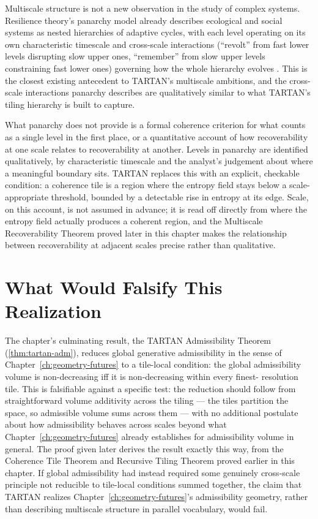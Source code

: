 \documentclass[12pt,twoside,openright]{book}
\begin{document}
Multiscale structure is not a new observation in the study of
complex systems. Resilience theory's panarchy model already
describes ecological and social systems as nested hierarchies
of adaptive cycles, with each level operating on its own
characteristic timescale and cross-scale interactions
(``revolt'' from fast lower levels disrupting slow upper ones,
``remember'' from slow upper levels constraining fast lower
ones) governing how the whole hierarchy evolves
\parencite{holling1973,gunderson2002,walker2004}. This is the
closest existing antecedent to TARTAN's multiscale ambitions,
and the cross-scale interactions panarchy describes are
qualitatively similar to what TARTAN's tiling hierarchy is
built to capture.

What panarchy does not provide is a formal coherence criterion
for what counts as a single level in the first place, or a
quantitative account of how recoverability at one scale
relates to recoverability at another. Levels in panarchy are
identified qualitatively, by characteristic timescale and
the analyst's judgement about where a meaningful boundary
sits. TARTAN replaces this with an explicit, checkable
condition: a coherence tile is a region where the entropy
field stays below a scale-appropriate threshold, bounded by a
detectable rise in entropy at its edge. Scale, on this
account, is not assumed in advance; it is read off directly
from where the entropy field actually produces a coherent
region, and the Multiscale Recoverability Theorem proved later
in this chapter makes the relationship between recoverability
at adjacent scales precise rather than qualitative.

\section{What Would Falsify This Realization}
\label{sec:ch26-falsifiability}

The chapter's culminating result, the TARTAN Admissibility
Theorem (\cref{thm:tartan-adm}), reduces global generative
admissibility in the sense of Chapter~\ref{ch:geometry-futures}
to a tile-local condition: the global admissibility volume is
non-decreasing iff it is non-decreasing within every finest-
resolution tile. This is falsifiable against a specific test:
the reduction should follow from straightforward volume
additivity across the tiling --- the tiles partition the space,
so admissible volume sums across them --- with no additional
postulate about how admissibility behaves across scales beyond
what Chapter~\ref{ch:geometry-futures} already establishes for
admissibility volume in general. The proof given later derives
the result exactly this way, from the Coherence Tile Theorem
and Recursive Tiling Theorem proved earlier in this chapter. If
global admissibility had instead required some genuinely
cross-scale principle not reducible to tile-local conditions
summed together, the claim that TARTAN realizes
Chapter~\ref{ch:geometry-futures}'s admissibility geometry,
rather than describing multiscale structure in parallel
vocabulary, would fail.
\end{document}

